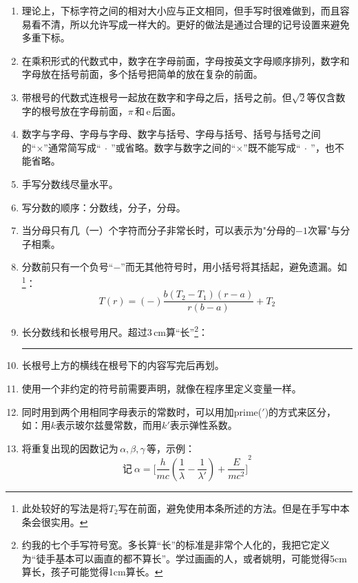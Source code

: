 \documentclass[11pt, a4paper, titlepage]{article}
\begin{document}
\begin{enumerate}
\item 理论上，下标字符之间的相对大小应与正文相同，但手写时很难做到，而且容易看不清，所以允许写成一样大的。更好的做法是通过合理的记号设置来避免多重下标。

\item 在乘积形式的代数式中，数字在字母前面，字母按英文字母顺序排列，数字和字母放在括号前面，多个括号把简单的放在复杂的前面。

\item 带根号的代数式连根号一起放在数字和字母之后，括号之前。但$\sqrt{2}$等仅含数字的根号放在字母前面，$\pi$\,和\,$\mathrm{e}$\,后面。

\item 数字与字母、字母与字母、数字与括号、字母与括号、括号与括号之间的``×''通常简写成``$\:\cdot\:$''或省略。数字与数字之间的``×''既不能写成``$\:\cdot\:$''，也不能省略。

\item 手写分数线尽量水平。

\item 写分数的顺序：分数线，分子，分母。

\item 当分母只有几（一）个字符而分子非常长时，可以表示为"分母的$-1$次幂"与分子相乘。

\item 分数前只有一个负号``$-$''而无其他符号时，用小括号将其括起，避免遗漏。如\footnote{此处较好的写法是将$T_{2}$写在前面，避免使用本条所述的方法。但是在手写中本条会很实用。}：
    \begin{displaymath}
        T(r) = (-)\frac{b(T_{2}-T_{1})(r-a)}{r(b-a)} + T_{2}
    \end{displaymath}

\item 长分数线和长根号用尺。超过$3\,\mathrm{cm}$算“长”\footnote{约我的七个手写符号宽。多长算“长”的标准是非常个人化的，我把它定义为“徒手基本可以画直的都不算长”。学过画画的人，或者姚明，可能觉得5cm算长，孩子可能觉得1cm算长。}：\rule[2pt]{3cm}{0.6pt}

\item 长根号上方的横线在根号下的内容写完后再划。

\item 使用一个非约定的符号前需要声明，就像在程序里定义变量一样。

\item 同时用到两个用相同字母表示的常数时，可以用加prime($'$)的方式来区分，如：用$k$表示玻尔兹曼常数，而用$k'$表示弹性系数。

\item \label{bracket}将重复出现的因数记为$\,\alpha ,\beta ,\gamma\,$等，示例：
    \begin{displaymath}
        \text{记}\ \alpha = {\biggl[ \frac{h}{mc} \left( \frac{1}{\lambda} - \frac{1}{\lambda'} \right) + \frac{E}{mc^{2}}\biggr]}^{2}
    \end{displaymath}


\end{enumerate}
\end{document}
